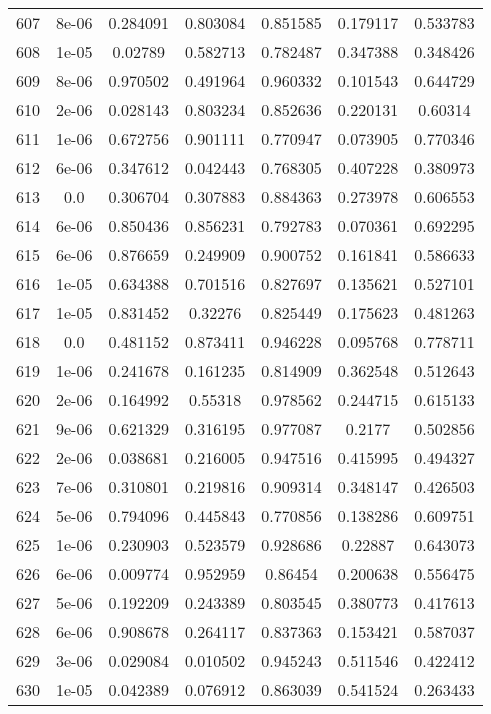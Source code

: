 \begin{table}
\begin{tabular*}{\linewidth}{c|c|c|c|c|c|c}
607 & 8e-06 & 0.284091 & 0.803084 & 0.851585 & 0.179117 & 0.533783\\
608 & 1e-05 & 0.02789 & 0.582713 & 0.782487 & 0.347388 & 0.348426\\
609 & 8e-06 & 0.970502 & 0.491964 & 0.960332 & 0.101543 & 0.644729\\
610 & 2e-06 & 0.028143 & 0.803234 & 0.852636 & 0.220131 & 0.60314\\
611 & 1e-06 & 0.672756 & 0.901111 & 0.770947 & 0.073905 & 0.770346\\
612 & 6e-06 & 0.347612 & 0.042443 & 0.768305 & 0.407228 & 0.380973\\
613 & 0.0 & 0.306704 & 0.307883 & 0.884363 & 0.273978 & 0.606553\\
614 & 6e-06 & 0.850436 & 0.856231 & 0.792783 & 0.070361 & 0.692295\\
615 & 6e-06 & 0.876659 & 0.249909 & 0.900752 & 0.161841 & 0.586633\\
616 & 1e-05 & 0.634388 & 0.701516 & 0.827697 & 0.135621 & 0.527101\\
617 & 1e-05 & 0.831452 & 0.32276 & 0.825449 & 0.175623 & 0.481263\\
618 & 0.0 & 0.481152 & 0.873411 & 0.946228 & 0.095768 & 0.778711\\
619 & 1e-06 & 0.241678 & 0.161235 & 0.814909 & 0.362548 & 0.512643\\
620 & 2e-06 & 0.164992 & 0.55318 & 0.978562 & 0.244715 & 0.615133\\
621 & 9e-06 & 0.621329 & 0.316195 & 0.977087 & 0.2177 & 0.502856\\
622 & 2e-06 & 0.038681 & 0.216005 & 0.947516 & 0.415995 & 0.494327\\
623 & 7e-06 & 0.310801 & 0.219816 & 0.909314 & 0.348147 & 0.426503\\
624 & 5e-06 & 0.794096 & 0.445843 & 0.770856 & 0.138286 & 0.609751\\
625 & 1e-06 & 0.230903 & 0.523579 & 0.928686 & 0.22887 & 0.643073\\
626 & 6e-06 & 0.009774 & 0.952959 & 0.86454 & 0.200638 & 0.556475\\
627 & 5e-06 & 0.192209 & 0.243389 & 0.803545 & 0.380773 & 0.417613\\
628 & 6e-06 & 0.908678 & 0.264117 & 0.837363 & 0.153421 & 0.587037\\
629 & 3e-06 & 0.029084 & 0.010502 & 0.945243 & 0.511546 & 0.422412\\
630 & 1e-05 & 0.042389 & 0.076912 & 0.863039 & 0.541524 & 0.263433\\
\end{tabular*}
\end{table}
